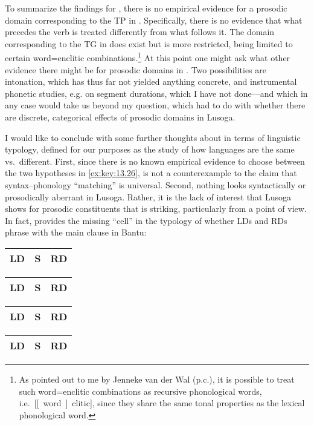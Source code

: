 \documentclass[output=paper]{langsci/langscibook}
\begin{document}
To summarize the findings for , there is no empirical evidence for a
prosodic domain corresponding to the \gls{TP} in .
Specifically, there is no evidence that what precedes the verb is treated
differently from what follows it. The domain corresponding to the
\gls{TG} in  does exist but is more restricted, being limited to
certain word=enclitic combinations.\footnote{As pointed out to me by Jenneke
    van der Wal (p.c.), it is possible to treat such word=enclitic combinations
    as recursive phonological words, i.e.\ [[~word~]~clitic],
since they share the same tonal properties as the lexical phonological word.}
At this point one might ask what other evidence there might be for prosodic
domains in .  Two possibilities are intonation,
which has thus far not yielded anything concrete, and instrumental phonetic
studies, e.g. on segment durations, which I have not done—and which in any case
would take us beyond my question, which had to do with whether there are
discrete, categorical effects of prosodic domains in Lusoga.

I would like to conclude with some further thoughts about  in terms of
linguistic typology, defined for our purposes as the study of how languages are
the same vs.\ different. First, since there is no known empirical evidence to
choose between the two hypotheses in \eqref{ex:key:13.26},  is not a
counterexample to the claim that syntax--phonology “matching” is universal.  Second, nothing looks syntactically or
prosodically aberrant in Lusoga. Rather, it is the lack of interest that Lusoga
shows for prosodic constituents that is striking, particularly from a 
point of view. In fact,  provides the missing “cell” in the typology of
whether \glspl{LD} and \glspl{RD}
phrase with the main clause in Bantu:\newpage

\ea\label{ex:key:13.46}
    \ea \begin{tabular}{|c|cc|}\hline \gls{LD} & S & RD\\\hline\end{tabular}\quad {}
    \ex \begin{tabular}{|cc|c|}\hline \gls{LD} & S & RD\\\hline\end{tabular}\quad {}
    \ex \begin{tabular}{|c|c|c|}\hline \gls{LD} & S & RD\\\hline\end{tabular}\quad {}
    \ex \begin{tabular}{|ccc|}\hline \gls{LD} & S & RD\\\hline\end{tabular}\quad {}
    \z
\z
\end{document}
